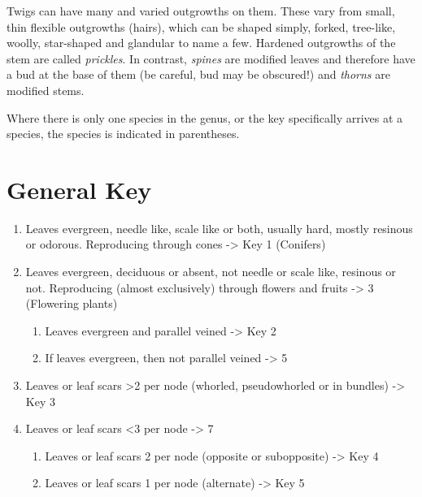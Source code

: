 \documentclass[openany]{book}
\providecommand{\tightlist}{%
  \setlength{\itemsep}{0pt}\setlength{\parskip}{0pt}}
\begin{document}
Twigs can have many and varied outgrowths on them. These vary from small, thin flexible outgrowths (hairs), which can be shaped simply, forked, tree-like, woolly, star-shaped and glandular to name a few. Hardened outgrowths of the stem are called \emph{prickles}. In contrast, \emph{spines} are modified leaves and therefore have a bud at the base of them (be careful, bud may be obscured!) and \emph{thorns} are modified stems.

Where there is only one species in the genus, or the key specifically arrives at a species, the species is indicated in parentheses.

\hypertarget{general-key}{%
\chapter*{General Key}\label{general-key}}

\begin{enumerate}
\def\labelenumi{\arabic{enumi}.}
\item
  Leaves evergreen, needle like, scale like or both, usually hard, mostly resinous or odorous. Reproducing through cones -\textgreater{} Key 1 (Conifers)
\item
  Leaves evergreen, deciduous or absent, not needle or scale like, resinous or not. Reproducing (almost exclusively) through flowers and fruits -\textgreater{} 3 (Flowering plants)

  \begin{enumerate}
  \def\labelenumii{\arabic{enumii}.}
  \setcounter{enumii}{2}
  \tightlist
  \item
    Leaves evergreen and parallel veined -\textgreater{} Key 2
  \item
    If leaves evergreen, then not parallel veined -\textgreater{} 5
  \end{enumerate}
\item
  Leaves or leaf scars \textgreater{}2 per node (whorled, pseudowhorled or in bundles) -\textgreater{} Key 3
\item
  Leaves or leaf scars \textless{}3 per node -\textgreater{} 7

  \begin{enumerate}
  \def\labelenumii{\arabic{enumii}.}
  \setcounter{enumii}{6}
  \tightlist
  \item
    Leaves or leaf scars 2 per node (opposite or subopposite) -\textgreater{} Key 4
  \item
    Leaves or leaf scars 1 per node (alternate) -\textgreater{} Key 5
  \end{enumerate}
\end{enumerate}
\end{document}
